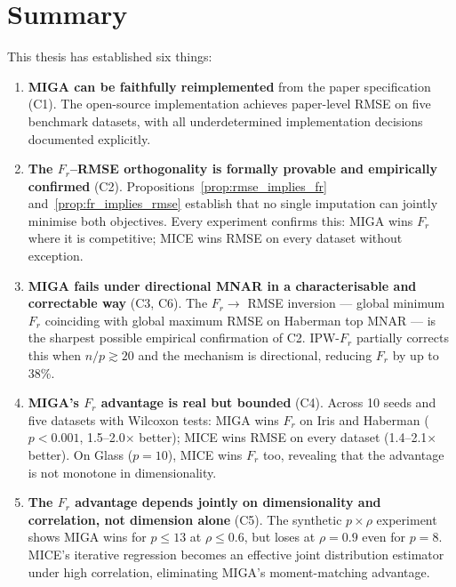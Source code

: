 
\section{Summary}

This thesis has established six things:

\begin{enumerate}
    \item \textbf{MIGA can be faithfully reimplemented} from the paper specification (C1). The open-source implementation achieves paper-level RMSE on five benchmark datasets, with all underdetermined implementation decisions documented explicitly.

    \item \textbf{The $F_r$--RMSE orthogonality is formally provable and empirically confirmed} (C2). Propositions~\ref{prop:rmse_implies_fr} and~\ref{prop:fr_implies_rmse} establish that no single imputation can jointly minimise both objectives. Every experiment confirms this: MIGA wins $F_r$ where it is competitive; MICE wins RMSE on every dataset without exception.

    \item \textbf{MIGA fails under directional MNAR in a characterisable and correctable way} (C3, C6). The $F_r \to$ RMSE inversion --- global minimum $F_r$ coinciding with global maximum RMSE on Haberman top MNAR --- is the sharpest possible empirical confirmation of C2. IPW-$F_r$ partially corrects this when $n/p \gtrsim 20$ and the mechanism is directional, reducing $F_r$ by up to 38\%.

    \item \textbf{MIGA's $F_r$ advantage is real but bounded} (C4). Across 10 seeds and five datasets with Wilcoxon tests: MIGA wins $F_r$ on Iris and Haberman ($p < 0.001$, 1.5--2.0$\times$ better); MICE wins RMSE on every dataset (1.4--2.1$\times$ better). On Glass ($p=10$), MICE wins $F_r$ too, revealing that the advantage is not monotone in dimensionality.

    \item \textbf{The $F_r$ advantage depends jointly on dimensionality and correlation, not dimension alone} (C5). The synthetic $p \times \rho$ experiment shows MIGA wins for $p \leq 13$ at $\rho \leq 0.6$, but loses at $\rho = 0.9$ even for $p = 8$. MICE's iterative regression becomes an effective joint distribution estimator under high correlation, eliminating MIGA's moment-matching advantage.


\end{enumerate}
